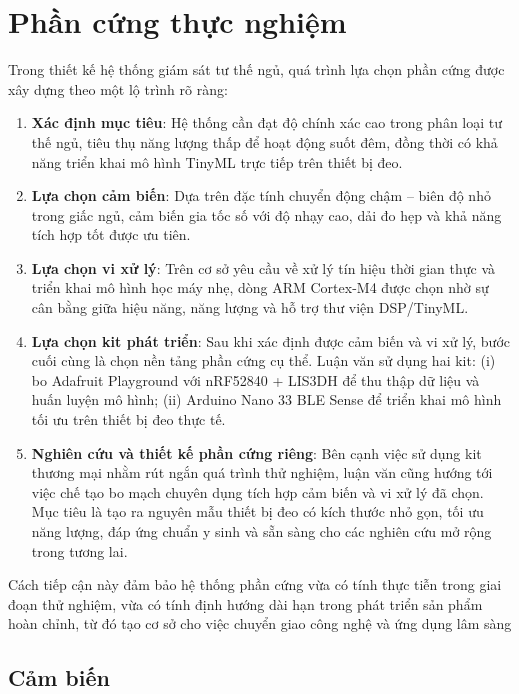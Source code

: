 
\section{Phần cứng thực nghiệm \label{section_overview_propsed_method}}
Trong thiết kế hệ thống giám sát tư thế ngủ, quá trình lựa chọn phần cứng được xây dựng theo một lộ trình rõ ràng:

\begin{enumerate}
\item \textbf{Xác định mục tiêu}: Hệ thống cần đạt độ chính xác cao trong phân loại tư thế ngủ, tiêu thụ năng lượng thấp để hoạt động suốt đêm, đồng thời có khả năng triển khai mô hình TinyML trực tiếp trên thiết bị đeo.
\item \textbf{Lựa chọn cảm biến}: Dựa trên đặc tính chuyển động chậm – biên độ nhỏ trong giấc ngủ, cảm biến gia tốc số với độ nhạy cao, dải đo hẹp và khả năng tích hợp tốt được ưu tiên.
\item \textbf{Lựa chọn vi xử lý}: Trên cơ sở yêu cầu về xử lý tín hiệu thời gian thực và triển khai mô hình học máy nhẹ, dòng ARM Cortex-M4 được chọn nhờ sự cân bằng giữa hiệu năng, năng lượng và hỗ trợ thư viện DSP/TinyML.
\item \textbf{Lựa chọn kit phát triển}: Sau khi xác định được cảm biến và vi xử lý, bước cuối cùng là chọn nền tảng phần cứng cụ thể. Luận văn sử dụng hai kit: (i) bo Adafruit Playground với nRF52840 + LIS3DH để thu thập dữ liệu và huấn luyện mô hình; (ii) Arduino Nano 33 BLE Sense để triển khai mô hình tối ưu trên thiết bị đeo thực tế.
\item \textbf{Nghiên cứu và thiết kế phần cứng riêng}: Bên cạnh việc sử dụng kit thương mại nhằm rút ngắn quá trình thử nghiệm, luận văn cũng hướng tới việc chế tạo bo mạch chuyên dụng tích hợp cảm biến và vi xử lý đã chọn. Mục tiêu là tạo ra nguyên mẫu thiết bị đeo có kích thước nhỏ gọn, tối ưu năng lượng, đáp ứng chuẩn y sinh và sẵn sàng cho các nghiên cứu mở rộng trong tương lai.
\end{enumerate}

Cách tiếp cận này đảm bảo hệ thống phần cứng vừa có tính thực tiễn trong giai đoạn thử nghiệm, vừa có tính định hướng dài hạn trong phát triển sản phẩm hoàn chỉnh, từ đó tạo cơ sở cho việc chuyển giao công nghệ và ứng dụng lâm sàng
\subsection{Cảm biến \label{section_overview_propsed_method}}

